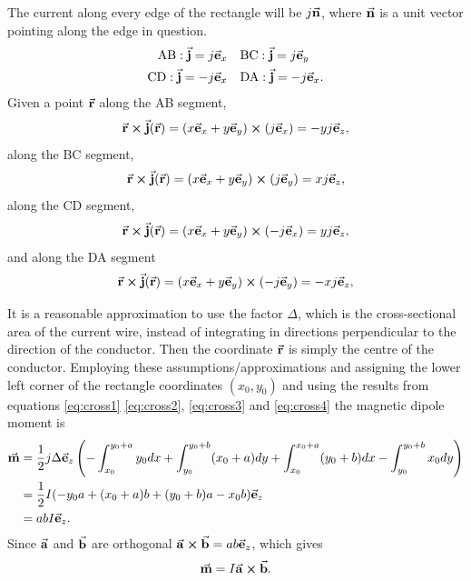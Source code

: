 \documentclass[11pt]{amsart}
\begin{document}
The current along every edge of the rectangle will be $j\va{n}$, where $\va{n}$ is a unit vector pointing along the edge in question.
\begin{align*}
\text{AB}: \va{j} =j\va{e}_x &\quad \text{BC}: \va{j} =j\va{e}_y \\
\text{CD}: \va{j} =-j\va{e}_x &\quad \text{DA}: \va{j} =-j\va{e}_x.
\end{align*}
Given a point $\va{r}$ along the AB segment,
\begin{equation}
\label{eq:cross1}
\va{r}\cp\va{j}(\va{r}) = (x\va{e}_x + y\va{e}_y)\cp(j\va{e}_x) = -yj\va{e}_z,
\end{equation}
along the BC segment,
\begin{equation}
\label{eq:cross2}
\va{r}\cp\va{j}(\va{r}) = (x\va{e}_x + y\va{e}_y)\cp(j\va{e}_y) = xj\va{e}_z,
\end{equation}
along the CD segment,
\begin{equation}
\label{eq:cross3}
\va{r}\cp\va{j}(\va{r}) = (x\va{e}_x + y\va{e}_y)\cp(-j\va{e}_x) = yj\va{e}_z,
\end{equation}
and along the DA segment
\begin{equation}
\label{eq:cross4}
\va{r}\cp\va{j}(\va{r}) = (x\va{e}_x + y\va{e}_y)\cp(-j\va{e}_y) = -xj\va{e}_z,
\end{equation}

It is a reasonable approximation to use the factor $\Delta$, which is the cross-sectional area of the current wire, instead of integrating in directions perpendicular to the direction of the conductor. Then the coordinate $\va{r}$ is simply the centre of the conductor. Employing these assumptions/approximations and assigning the lower left corner of the rectangle coordinates $(x_0,y_0)$ and using the results from equations \ref{eq:cross1} \ref{eq:cross2}, \ref{eq:cross3} and \ref{eq:cross4} the magnetic dipole moment is
\begin{align*}
\va{m} &= \frac{1}{2}j\Delta\va{e}_z \left(
-\int_{x_0}^{y_0+a} y_0dx + \int_{y_0}^{y_0+b}(x_0+a)dy +\int_{x_0}^{x_0+a}(y_0+b)dx - \int_{y_0}^{y_0+b}x_0dy
\right) \\
&=\frac{1}{2} I (-y_0a + (x_0 + a)b + (y_0 + b)a - x_0b)\va{e}_z \\
&=abI\va{e}_z.
\end{align*} 
Since $\va{a}$ and $\va{b}$ are orthogonal $\va{a} \cp \va{b} = ab\va{e}_z$, which gives
\begin{equation}
\va{m} = I\va{a} \cp \va{b}.
\end{equation}
\end{document}
